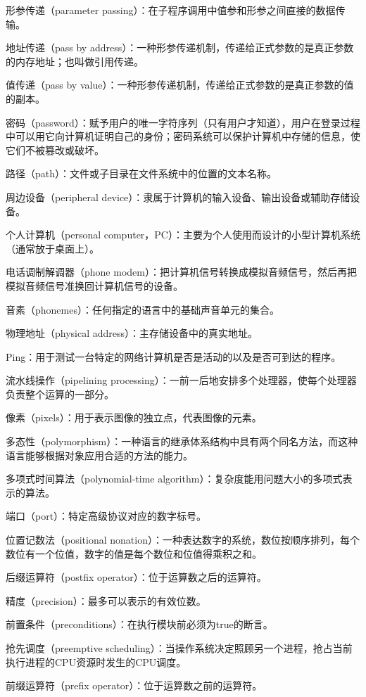 形参传递（parameter passing）：在子程序调用中值参和形参之间直接的数据传输。

地址传递（pass by address）：一种形参传递机制，传递给正式参数的是真正参数的内存地址；也叫做引用传递。

值传递（pass by value）：一种形参传递机制，传递给正式参数的是真正参数的值的副本。

密码（password）：赋予用户的唯一字符序列（只有用户才知道），用户在登录过程中可以用它向计算机证明自己的身份；密码系统可以保护计算机中存储的信息，使它们不被篡改或破坏。

路径（path）：文件或子目录在文件系统中的位置的文本名称。

周边设备（peripheral device）：隶属于计算机的输入设备、输出设备或辅助存储设备。

个人计算机（personal computer，PC）：主要为个人使用而设计的小型计算机系统（通常放于桌面上）。

电话调制解调器（phone modem）：把计算机信号转换成模拟音频信号，然后再把模拟音频信号准换回计算机信号的设备。

音素（phonemes）：任何指定的语言中的基础声音单元的集合。

物理地址（physical address）：主存储设备中的真实地址。

Ping：用于测试一台特定的网络计算机是否是活动的以及是否可到达的程序。

流水线操作（pipelining processing）：一前一后地安排多个处理器，使每个处理器负责整个运算的一部分。

像素（pixels）：用于表示图像的独立点，代表图像的元素。

多态性（polymorphism）：一种语言的继承体系结构中具有两个同名方法，而这种语言能够根据对象应用合适的方法的能力。

多项式时间算法（polynomial-time algorithm）：复杂度能用问题大小的多项式表示的算法。

端口（port）：特定高级协议对应的数字标号。

位置记数法（positional nonation）：一种表达数字的系统，数位按顺序排列，每个数位有一个位值，数字的值是每个数位和位值得乘积之和。

后缀运算符（postfix operator）：位于运算数之后的运算符。

精度（precision）：最多可以表示的有效位数。

前置条件（preconditions）：在执行模块前必须为true的断言。

抢先调度（preemptive scheduling）：当操作系统决定照顾另一个进程，抢占当前执行进程的CPU资源时发生的CPU调度。

前缀运算符（prefix operator）：位于运算数之前的运算符。

